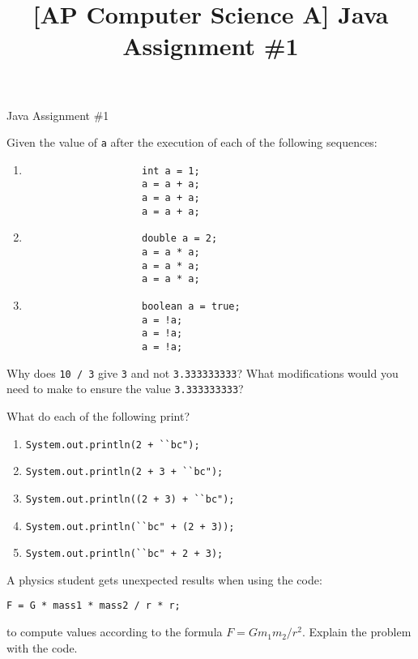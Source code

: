 \documentclass[11pt]{exam}
\title{[AP Computer Science A] Java Assignment \#1}
\newcommand{\AssignmentTitle}{Java Assignment \#1}
\newcommand{\ColorQuestion}[2]{\renewcommand{\questionlabel}{\colorbox{#1}{\color{white}\thequestion}\hfill}\question #2}
\newcommand{\BlueQuestion}[1]{\ColorQuestion{RoyalBlue}{#1}}
\newcommand{\GreenQuestion}[1]{\ColorQuestion{ForestGreen}{#1}}
\begin{document}
	\begin{center}
		\Large\AssignmentTitle
	\end{center}

	\begin{questions}
		\BlueQuestion{Given the value of \lstinline{a} after the execution of each of the following sequences:}
		\begin{enumerate}
			\item
				\begin{lstlisting}
					int a = 1;
					a = a + a;
					a = a + a;
					a = a + a;
				\end{lstlisting}

			\item
				\begin{lstlisting}
					double a = 2;
					a = a * a;
					a = a * a;
					a = a * a;
				\end{lstlisting}

			\item
				\begin{lstlisting}
					boolean a = true;
					a = !a;
					a = !a;
					a = !a;
				\end{lstlisting}
		\end{enumerate}

		\BlueQuestion{Why does \lstinline{10 / 3} give \lstinline{3} and not \lstinline{3.333333333}? What modifications would you need to make to ensure the value \lstinline{3.333333333}?}
		
		\GreenQuestion{What do each of the following print?}
		\begin{enumerate}
			\item \lstinline{System.out.println(2 + ``bc");}
			\item \lstinline{System.out.println(2 + 3 + ``bc");}
			\item \lstinline{System.out.println((2 + 3) + ``bc");}
			\item \lstinline{System.out.println(``bc" + (2 + 3));}
			\item \lstinline{System.out.println(``bc" + 2 + 3);}
		\end{enumerate}
		
		\GreenQuestion{A physics student gets unexpected results when using the code:}
		\begin{center}
			\lstinline{F = G * mass1 * mass2 / r * r;}
		\end{center}
		to compute values according to the formula $F = Gm_1m_2/r^2$. Explain the problem with the code.


\end{questions}
\end{document}
